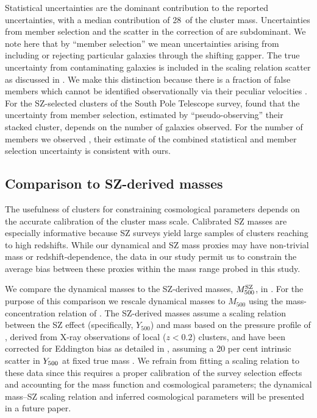 Statistical uncertainties are the dominant contribution to the reported uncertainties, with a median contribution of 28\percent\ of the cluster mass. Uncertainties from member selection and the scatter in the correction of  are subdominant. We note here that by ``member selection'' we mean uncertainties arising from including or rejecting particular galaxies through the shifting gapper. The true uncertainty from contaminating galaxies is included in the scaling relation scatter as discussed in . We make this distinction because there is a fraction of false members which cannot be identified observationally via their peculiar velocities \citep[e.g.,][]{mamon10,white10,saro13}. For the SZ-selected clusters of the South Pole Telescope survey, \cite{ruel14} found that the uncertainty from member selection, estimated by ``pseudo-observing'' their stacked cluster, depends on the number of galaxies observed. For the number of members we observed \citep[which is roughly a factor two larger than the average number of members observed by][]{ruel14}, their estimate of the combined statistical and member selection uncertainty is consistent with ours.

\subsection{Comparison to SZ-derived masses}
\label{s:msz}

The usefulness of clusters for constraining cosmological parameters depends on the accurate 
calibration of the cluster mass scale. Calibrated SZ masses are especially informative because SZ 
surveys yield large samples of clusters reaching to high redshifts. While our dynamical and SZ 
mass proxies may have non-trivial mass or redshift-dependence, the data in our study permit us to
constrain the average bias between these proxies within the mass range probed in this study.

We compare the dynamical masses to the SZ-derived masses, $M_{500}^{\rm SZ}$, in . For 
the purpose of this comparison we rescale dynamical masses to $M_{500}$ using the 
mass-concentration relation of \cite{dutton14}. The SZ-derived masses assume a scaling relation 
between the SZ effect (specifically, $Y_{500}$) and mass based on the pressure profile of 
\cite{arnaud10}, derived from X-ray observations of local ($z<0.2$) clusters, and have been 
corrected for Eddington bias as detailed in \cite{hasselfield13}, assuming a 20 per cent intrinsic 
scatter in $Y_{\rm 500}$ at fixed true mass \citep[the ``UPP'' masses of][]{hasselfield13}. We 
refrain from fitting a scaling relation to these data since this requires a proper calibration of 
the survey selection effects and accounting for the mass function and cosmological parameters; the 
dynamical mass--SZ scaling relation and inferred cosmological parameters will be presented in a 
future paper.

